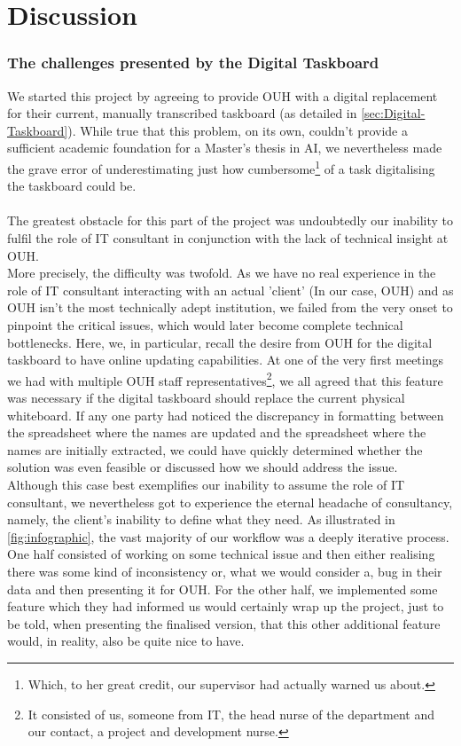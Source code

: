 \section{Discussion}
\subsubsection*{The challenges presented by the Digital Taskboard}
We started this project by agreeing to provide OUH with a digital replacement for their current, manually transcribed taskboard (as detailed in \autoref{sec:Digital-Taskboard}). While true that this problem, on its own, couldn't provide a sufficient academic foundation for a Master's thesis in AI, we nevertheless made the grave error of underestimating just how cumbersome\footnote{Which, to her great credit, our supervisor had actually warned us about.} of a task digitalising the taskboard could be.
\\
\\
The greatest obstacle for this part of the project was undoubtedly our inability to fulfil the role of IT consultant in conjunction with the lack of technical insight at OUH.
\\
More precisely, the difficulty was twofold. As we have no real experience in the role of IT consultant interacting with an actual 'client' (In our case, OUH) and as OUH isn't the most technically adept institution, we failed from the very onset to pinpoint the critical issues, which would later become complete technical bottlenecks. Here, we, in particular, recall the desire from OUH for the digital taskboard to have online updating capabilities. At one of the very first meetings we had with multiple OUH staff representatives\footnote{It consisted of us, someone from IT, the head nurse of the department and our contact, a project and development nurse.}, we all agreed that this feature was necessary if the digital taskboard should replace the current physical whiteboard. If any one party had noticed the discrepancy in formatting between the spreadsheet where the names are updated and the spreadsheet where the names are initially extracted, we could have quickly determined whether the solution was even feasible or discussed how we should address the issue.
\\
Although this case best exemplifies our inability to assume the role of IT consultant, we nevertheless got to experience the eternal headache of consultancy, namely, the client's inability to define what they need. As illustrated in \autoref{fig:infographic}, the vast majority of our workflow was a deeply iterative process. One half consisted of working on some technical issue and then either realising there was some kind of inconsistency or, what we would consider a, bug in their data and then presenting it for OUH. For the other half, we implemented some feature which they had informed us would certainly wrap up the project, just to be told, when presenting the finalised version, that this other additional feature would, in reality, also be quite nice to have.
